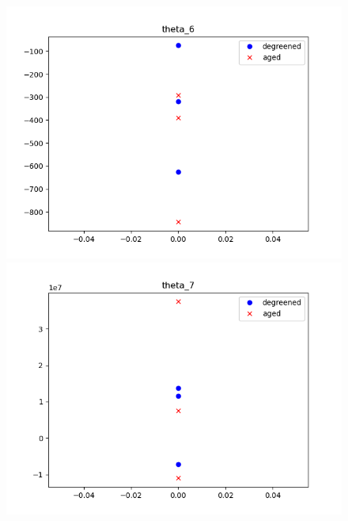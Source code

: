 \begin{figure}[H]
        \begin{minipage}{0.3\textwidth}
                \includegraphics[width = \textwidth]{./figs/figs_new_mdl/theta_6.png}
        \end{minipage}
        \begin{minipage}{0.3\textwidth}
                \includegraphics[width = \textwidth]{./figs/figs_new_mdl/theta_7.png}
        \end{minipage}
        \begin{minipage}{0.3\textwidth}

\end{minipage}
\end{figure}
